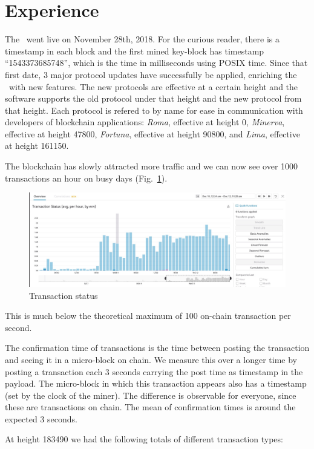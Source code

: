 \section{Experience}
\label{sect:results}

The \blockchain\ went live on November 28th, 2018. For the curious reader, there is a timestamp in each block and the first mined key-block has timestamp ``1543373685748'', which is the time in milliseconds using POSIX time. Since that first date, 3 major protocol updates have successfully be applied, enriching the \blockchain\ with new features. The new protocols are effective at a certain height and the software supports the old protocol under that height and the new protocol from that height. Each protocol is refered to by name for ease in communication with developers of blockchain applications: \textit{Roma}, effective at height 0, \textit{Minerva}, effective at height 47800, \textit{Fortuna}, effective at height 90800, and \textit{Lima}, effective at height 161150.

The blockchain has slowly attracted more traffic and we can now see over 1000 transactions an hour on busy days (Fig.\ \ref{txs-nrs}).
\begin{figure}[h]
   \includegraphics[scale=0.23]{TransactionsDec2019.jpg}
   \caption{Transaction status}
   \label{txs-nrs}
\end{figure}
This is much below the theoretical maximum of 100 on-chain transaction per second.

The confirmation time of transactions is the time between posting the transaction and seeing it in a micro-block on chain. We measure this over a longer time by posting a transaction each 3 seconds carrying the post time as timestamp in the payload. The micro-block in which this transaction appears also has a timestamp (set by the clock of the miner). The difference is observable for everyone, since these are transactions on chain. The mean of confirmation times is around the expected 3 seconds.

At height 183490 we had the following totals of different transaction types:

